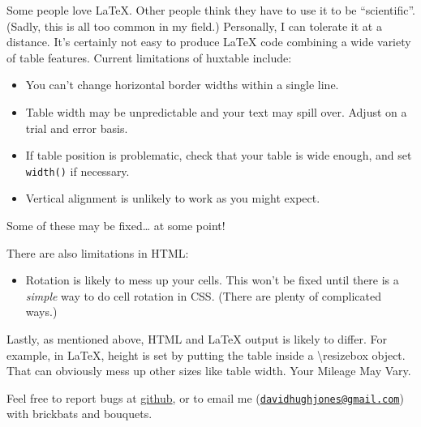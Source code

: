 \documentclass[]{article}
\providecommand{\tightlist}{%
  \setlength{\itemsep}{0pt}\setlength{\parskip}{0pt}}
\begin{document}
Some people love LaTeX. Other people think they have to use it to be
``scientific''. (Sadly, this is all too common in my field.) Personally,
I can tolerate it at a distance. It's certainly not easy to produce
LaTeX code combining a wide variety of table features. Current
limitations of huxtable include:

\begin{itemize}
\tightlist
\item
  You can't change horizontal border widths within a single line.
\item
  Table width may be unpredictable and your text may spill over. Adjust
  on a trial and error basis.
\item
  If table position is problematic, check that your table is wide
  enough, and set \texttt{width()} if necessary.
\item
  Vertical alignment is unlikely to work as you might expect.
\end{itemize}

Some of these may be fixed\ldots{} at some point!

There are also limitations in HTML:

\begin{itemize}
\tightlist
\item
  Rotation is likely to mess up your cells. This won't be fixed until
  there is a \emph{simple} way to do cell rotation in CSS. (There are
  plenty of complicated ways.)
\end{itemize}

Lastly, as mentioned above, HTML and LaTeX output is likely to differ.
For example, in LaTeX, height is set by putting the table inside a
\textbackslash{}resizebox object. That can obviously mess up other sizes
like table width. Your Mileage May Vary.

Feel free to report bugs at
\href{https://github.com/hughjonesd/huxtable/issues}{github}, or to
email me
(\href{mailto:davidhughjones@gmail.com}{\nolinkurl{davidhughjones@gmail.com}})
with brickbats and bouquets.
\end{document}
